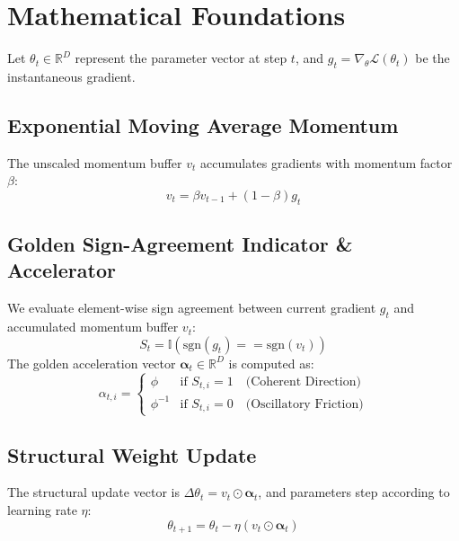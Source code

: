 \section{Mathematical Foundations}
Let $\theta_t \in \mathbb{R}^D$ represent the parameter vector at step $t$, and $g_t = \nabla_{\theta} \mathcal{L}(\theta_t)$ be the instantaneous gradient.

\subsection{Exponential Moving Average Momentum}
The unscaled momentum buffer $v_t$ accumulates gradients with momentum factor $\beta$:
\begin{equation}
    v_t = \beta v_{t-1} + (1 - \beta) g_t
\end{equation}

\subsection{Golden Sign-Agreement Indicator \& Accelerator}
We evaluate element-wise sign agreement between current gradient $g_t$ and accumulated momentum buffer $v_t$:
\begin{equation}
    S_t = \mathbb{I}\left( \text{sgn}(g_t) == \text{sgn}(v_t) \right)
\end{equation}
The golden acceleration vector $\mathbf{\alpha}_t \in \mathbb{R}^D$ is computed as:
\begin{equation}
    \alpha_{t, i} = \begin{cases} 
        \phi & \text{if } S_{t,i} = 1 \quad \text{(Coherent Direction)} \\ 
        \phi^{-1} & \text{if } S_{t,i} = 0 \quad \text{(Oscillatory Friction)} 
    \end{cases}
\end{equation}

\subsection{Structural Weight Update}
The structural update vector is $\Delta \theta_t = v_t \odot \mathbf{\alpha}_t$, and parameters step according to learning rate $\eta$:
\begin{equation}
    \theta_{t+1} = \theta_t - \eta \left( v_t \odot \mathbf{\alpha}_t \right)
\end{equation}